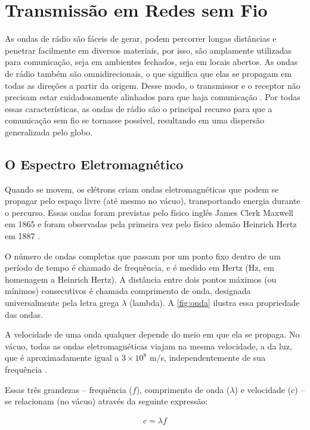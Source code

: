 \chapter{Transmissão em Redes sem Fio}
\label{cap:transmissao-redes-sem-fio}

As ondas de rádio são fáceis de gerar, podem percorrer longas distâncias e penetrar facilmente em diversos materiais, por isso, são amplamente utilizadas para comunicação, seja em ambientes fechados, seja em locais abertos. As ondas de rádio também são omnidirecionais, o que significa que elas se propagam em todas as direções a partir da origem. Desse modo, o transmissor e o receptor não precisam estar cuidadosamente alinhados para que haja comunicação \cite{tanenbaum2011}. Por todas essas características, as ondas de rádio são o principal recurso para que a comunicação sem fio se tornasse possível, resultando em uma dispersão generalizada pelo globo.

\section{O Espectro Eletromagnético}
\label{sec:espectro-eletromagnetico}

Quando se movem, os elétrons criam ondas eletromagnéticas que podem se propagar pelo espaço livre (até mesmo no vácuo), transportando energia durante o percurso. Essas ondas foram previstas pelo físico inglês James Clerk Maxwell em 1865 e foram observadas pela primeira vez pelo físico alemão Heinrich Hertz em 1887 \cite{tanenbaum2011}.

O número de ondas completas que passam por um ponto fixo dentro de um período de tempo é chamado de frequência, e é medido em Hertz (Hz, em homenagem a Heinrich Hertz). A distância entre dois pontos máximos (ou mínimos) consecutivos é chamada comprimento de onda, designada universalmente pela letra grega $\lambda$ (lambda). A \autoref{fig:onda} ilustra essa propriedade das ondas.

A velocidade de uma onda qualquer depende do meio em que ela se propaga. No vácuo, todas as ondas eletromagnéticas viajam na mesma velocidade, a da luz, que é aproximadamente igual a $3 \times 10^8$ m/s, independentemente de sua frequência \cite{tanenbaum2011}.

Essas três grandezas -- frequência ($f$), comprimento de onda ($\lambda$) e velocidade ($c$) -- se relacionam (no vácuo) através da seguinte expressão:

\begin{equation}
	\begin{aligned}
		c = \lambda f
	\end{aligned}
\end{equation}

